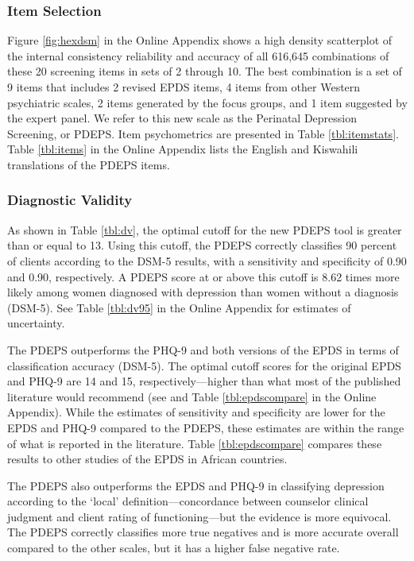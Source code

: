 \documentclass[man,natbib,longtable]{apa6}\usepackage[]{graphicx}\usepackage[]{color}
\begin{document}
\subsubsection{Item Selection}

Figure \ref{fig:hexdsm} in the Online Appendix shows a high density scatterplot of the internal consistency reliability and accuracy of all 616,645 combinations of these 20 screening items in sets of 2 through 10. The best combination is a set of 9 items that includes 2 revised EPDS items, 4 items from other Western psychiatric scales, 2 items generated by the focus groups, and 1 item suggested by the expert panel. We refer to this new scale as the Perinatal Depression Screening, or PDEPS. Item psychometrics are presented in Table \ref{tbl:itemstats}. Table \ref{tbl:items} in the Online Appendix lists the English and Kiswahili translations of the PDEPS items.



\subsubsection{Diagnostic Validity}

As shown in Table \ref{tbl:dv}, the optimal cutoff for the new PDEPS tool is greater than or equal to 13. Using this cutoff, the PDEPS correctly classifies 90 percent of clients according to the DSM-5 results, with a sensitivity and specificity of 0.90 and 0.90, respectively. A PDEPS score at or above this cutoff is 8.62 times more likely among women diagnosed with depression than women without a diagnosis (DSM-5). See Table \ref{tbl:dv95} in the Online Appendix for estimates of uncertainty.

The PDEPS outperforms the PHQ-9 and both versions of the EPDS in terms of classification accuracy (DSM-5). The optimal cutoff scores for the original EPDS and PHQ-9 are 14 and 15, respectively---higher than what most of the published literature would recommend (see \citep{kroenke:2001} and Table \ref{tbl:epdscompare} in the Online Appendix). While the estimates of sensitivity and specificity are lower for the EPDS and PHQ-9 compared to the PDEPS, these estimates are within the range of what is reported in the literature. Table \ref{tbl:epdscompare} compares these results to other studies of the EPDS in African countries.

The PDEPS also outperforms the EPDS and PHQ-9 in classifying depression according to the `local' definition---concordance between counselor clinical judgment and client rating of functioning---but the evidence is more equivocal. The PDEPS correctly classifies more true negatives and is more accurate overall compared to the other scales, but it has a higher false negative rate. 
\end{document}
